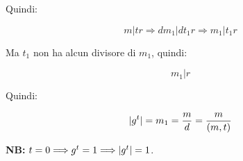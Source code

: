 \begin{dimostrazione}
	Quindi:
	
	\begin{equation}
		m|tr \Longrightarrow dm_1 | dt_1r \Longrightarrow m_1|t_1r
	\end{equation}

	Ma $t_1$ non ha alcun divisore di $m_1$, quindi:
	
	\begin{equation}
		m_1|r
	\end{equation}

	Quindi:
	
	\begin{equation}
		\lvert g^t \rvert = m_1 = \dfrac{m}{d} = \dfrac{m}{ ( m , t ) }
	\end{equation}

	\textbf{NB: } $t = 0 \Longrightarrow g^t = 1 \Longrightarrow \lvert g^t \rvert = 1$.
\end{dimostrazione}

